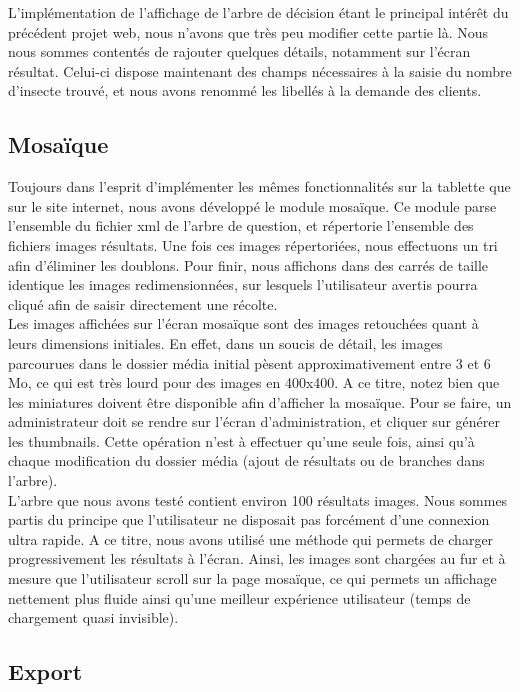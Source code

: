 \documentclass[twoside]{EPURapport}
\begin{document}
		L'implémentation de l'affichage de l'arbre de décision étant le principal intérêt du précédent projet web, nous n'avons que très peu modifier cette partie là. Nous nous sommes contentés de rajouter quelques détails, notamment sur l'écran résultat. Celui-ci dispose maintenant des champs nécessaires à la saisie du nombre d'insecte trouvé, et nous avons renommé les libellés à la demande des clients.
		
		\subsection{Mosaïque}

	Toujours dans l'esprit d'implémenter les mêmes fonctionnalités sur la tablette que sur le site internet, nous avons développé le module mosaïque. Ce module parse l'ensemble du fichier xml de l'arbre de question, et répertorie l'ensemble des fichiers images résultats. Une fois ces images répertoriées, nous effectuons un tri afin d'éliminer les doublons. Pour finir, nous affichons dans des carrés de taille identique les images redimensionnées, sur lesquels l'utilisateur avertis pourra cliqué afin de saisir directement une récolte.\\
	
	Les images affichées sur l'écran mosaïque sont des images retouchées quant à leurs dimensions initiales. En effet, dans un soucis de détail, les images parcourues dans le dossier média initial pèsent approximativement entre 3 et 6 Mo, ce qui est très lourd pour des images en 400x400. A ce titre, notez bien que les miniatures doivent être disponible afin d'afficher la mosaïque. Pour se faire, un administrateur doit se rendre sur l'écran d'administration, et cliquer sur générer les thumbnails. Cette opération n'est à effectuer qu'une seule fois, ainsi qu'à chaque modification du dossier média (ajout de résultats ou de branches dans l'arbre).\\
	
	L'arbre que nous avons testé contient environ 100 résultats images. Nous sommes partis du principe que l'utilisateur ne disposait pas forcément d'une connexion ultra rapide. A ce titre, nous avons utilisé une méthode qui permets de charger progressivement les résultats à l'écran. Ainsi, les images sont chargées au fur et à mesure que l'utilisateur scroll sur la page mosaïque, ce qui permets un affichage nettement plus fluide ainsi qu'une meilleur expérience utilisateur (temps de chargement quasi invisible).

		\subsection{Export}
		
\end{document}
